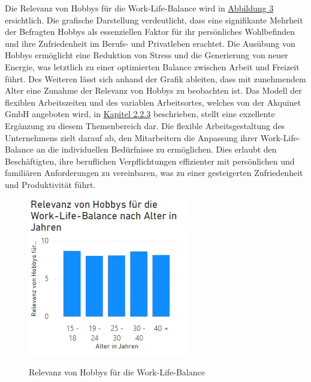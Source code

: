 Die Relevanz von Hobbys für die Work-Life-Balance wird in \hyperref[abb:worklife]{Abbildung 3} ersichtlich. Die grafische Darstellung verdeutlicht, dass eine signifikante Mehrheit der Befragten Hobbys als essenziellen Faktor für ihr persönliches Wohlbefinden und ihre Zufriedenheit im Berufs- und Privatleben erachtet.\newline
Die Ausübung von Hobbys ermöglicht eine Reduktion von Stress und die Generierung von neuer Energie, was letztlich zu einer optimierten Balance zwischen Arbeit und Freizeit führt. Des Weiteren lässt sich anhand der Grafik ableiten, dass mit zunehmendem Alter eine Zunahme der Relevanz von Hobbys zu beobachten ist.\newline
Das Modell der flexiblen Arbeitszeiten und des variablen Arbeitsortes, welches von der Akquinet GmbH angeboten wird, in \hyperref[sec:felxarbeitszeiten]{Kapitel 2.2.3} beschrieben, stellt eine exzellente Ergänzung zu diesem Themenbereich dar. Die flexible Arbeitsgestaltung des Unternehmens zielt darauf ab, den Mitarbeitern die Anpassung ihrer Work-Life-Balance an die individuellen Bedürfnisse zu ermöglichen. Dies erlaubt den Beschäftigten, ihre beruflichen Verpflichtungen effizienter mit persönlichen und familiären Anforderungen zu vereinbaren, was zu einer gesteigerten Zufriedenheit und Produktivität führt.
\begin{figure}[H]
    \centering
    \includegraphics[scale = 0.7]{fig/work life.png}
    \label{abb:worklife}
    \caption{Relevanz von Hobbys für die Work-Life-Balance}
\end{figure}

